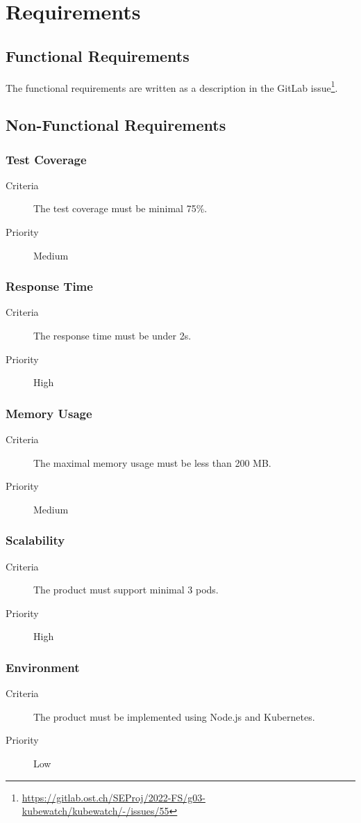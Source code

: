 \chapter{Requirements}



\section {Functional Requirements}
The functional requirements are written as a description in the GitLab issue\footnote{\url{https://gitlab.ost.ch/SEProj/2022-FS/g03-kubewatch/kubewatch/-/issues/55}}.


\section {Non-Functional Requirements}
\subsection{Test Coverage}
\begin{description}
\item[Criteria] The test coverage must be minimal 75\%.
\item[Priority] Medium
\end{description}

\subsection{Response Time}
\begin{description}
\item[Criteria] The response time must be under 2s.
\item[Priority] High
\end{description}

\subsection{Memory Usage}
\begin{description}
\item[Criteria] The maximal memory usage must be less than 200 MB.
\item[Priority] Medium
\end{description}

\subsection{Scalability}
\begin{description}
\item[Criteria] The product must support minimal 3 pods.
\item[Priority] High
\end{description}

\subsection{Environment}
\begin{description}
\item[Criteria] The product must be implemented using Node.js and Kubernetes.
\item[Priority] Low
\end{description}